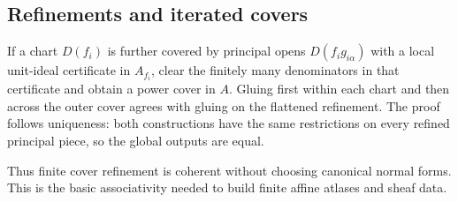 \subsection{Refinements and iterated covers}

If a chart $D(f_i)$ is further covered by principal opens $D(f_i g_{i\alpha})$ with a local
unit-ideal certificate in $A_{f_i}$, clear the finitely many denominators in that certificate and
obtain a power cover in $A$.  Gluing first within each chart and then across the outer cover agrees
with gluing on the flattened refinement.  The proof follows uniqueness: both constructions have the
same restrictions on every refined principal piece, so the global outputs are equal.

Thus finite cover refinement is coherent without choosing canonical normal forms.  This is the
basic associativity needed to build finite affine atlases and sheaf data.
